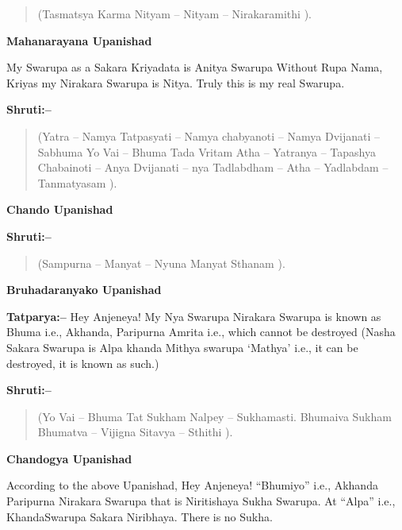 \begin{verse}
(Tasmatsya Karma Nityam – Nityam – Nirakaramithi ).
\end{verse}

\begin{flushright}
\textbf{Mahanarayana Upanishad}
\end{flushright}

My Swarupa as a Sakara Kriyadata is Anitya Swarupa Without Rupa Nama, Kriyas my Nirakara Swarupa is Nitya. Truly this is my real Swarupa.

\textbf{Shruti:–}

\begin{verse}
(Yatra – Namya Tatpasyati – Namya chabyanoti – Namya Dvijanati – Sabhuma  Yo Vai – Bhuma Tada Vritam  Atha – Yatranya – Tapashya Chabainoti – Anya Dvijanati  – nya Tadlabdham – Atha – Yadlabdam – Tanmatyasam ).
\end{verse}

\begin{flushright}
\textbf{Chando Upanishad}
\end{flushright}

\textbf{Shruti:–}

\begin{verse}
(Sampurna – Manyat – Nyuna Manyat Sthanam ).
\end{verse}

\begin{flushright}
\textbf{Bruhadaranyako Upanishad}
\end{flushright}

\textbf{Tatparya:–} Hey Anjeneya! My Nya Swarupa Nirakara Swarupa is known as Bhuma i.e., Akhanda, Paripurna Amrita i.e., which cannot be destroyed (Nasha Sakara Swarupa is Alpa khanda Mithya swarupa ‘Mathya’ i.e., it can be destroyed, it is known as such.)

\textbf{Shruti:–}

\begin{verse}
(Yo Vai – Bhuma Tat Sukham Nalpey – Sukhamasti.  Bhumaiva Sukham  Bhumatva – Vijigna Sitavya – Sthithi ).
\end{verse}

\begin{flushright}
\textbf{Chandogya Upanishad}
\end{flushright}

According to the above Upanishad, Hey Anjeneya! “Bhumiyo” i.e., Akhanda Paripurna Nirakara Swarupa that is Niritishaya Sukha Swarupa. At “Alpa” i.e., KhandaSwarupa Sakara Niribhaya. There is no Sukha.

